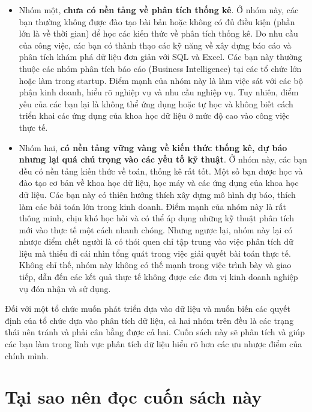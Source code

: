 \documentclass[]{krantz}
\theoremstyle{definition}
\theoremstyle{definition}
\theoremstyle{definition}
\theoremstyle{remark}
\begin{document}
\begin{itemize}
\item
  Nhóm một, \textbf{chưa có nền tảng về phân tích thống kê}. Ở nhóm này,
  các bạn thường không được đào tạo bài bản hoặc không có đủ điều kiện
  (phần lớn là về thời gian) để học các kiến thức về phân tích thống kê.
  Do nhu cầu của công việc, các bạn có thành thạo các kỹ năng về xây
  dựng báo cáo và phân tích khám phá dữ liệu đơn giản với SQL và Excel.
  Các bạn này thường thuộc các nhóm phân tích báo cáo (Business
  Intelligence) tại các tổ chức lớn hoặc làm trong startup. Điểm mạnh
  của nhóm này là làm việc sát với các bộ phận kinh doanh, hiểu rõ
  nghiệp vụ và nhu cầu nghiệp vụ. Tuy nhiên, điểm yếu của các bạn lại là
  không thể ứng dụng hoặc tự học và không biết cách triển khai các ứng
  dụng của khoa học dữ liệu ở mức độ cao vào công việc thực tế.
\item
  Nhóm hai, \textbf{có nền tảng vững vàng về kiến thức thống kê, dự báo
  nhưng lại quá chú trọng vào các yếu tố kỹ thuật}. Ở nhóm này, các bạn
  đều có nền tảng kiến thức về toán, thống kê rất tốt. Một số bạn được
  học và đào tạo cơ bản về khoa học dữ liệu, học máy và các ứng dụng của
  khoa học dữ liệu. Các bạn này có thiên hướng thích xây dựng mô hình dự
  báo, thích làm các bài toán lớn trong kinh doanh. Điểm mạnh của nhóm
  này là rất thông minh, chịu khó học hỏi và có thể áp dụng những kỹ
  thuật phân tích mới vào thực tế một cách nhanh chóng. Nhưng ngược lại,
  nhóm này lại có nhược điểm chết người là có thói quen chỉ tập trung
  vào việc phân tích dữ liệu mà thiếu đi cái nhìn tổng quát trong việc
  giải quyết bài toán thực tế. Không chỉ thế, nhóm này không có thế mạnh
  trong việc trình bày và giao tiếp, dẫn đến các kết quả thực tế không
  được các đơn vị kinh doanh nghiệp vụ đón nhận và sử dụng.
\end{itemize}

Đối với một tổ chức muốn phát triển dựa vào dữ liệu và muốn biến các
quyết định của tổ chức dựa vào phân tích dữ liệu, cả hai nhóm trên đều
là các trạng thái nên tránh và phải cân bằng được cả hai. Cuốn sách này
sẽ phân tích và giúp các bạn làm trong lĩnh vực phân tích dữ liệu hiểu
rõ hơn các ưu nhược điểm của chính mình.

\hypertarget{tai-sao-nen-oc-cun-sach-nay}{%
\section*{Tại sao nên đọc cuốn sách
này}\label{tai-sao-nen-oc-cun-sach-nay}}
\end{document}
